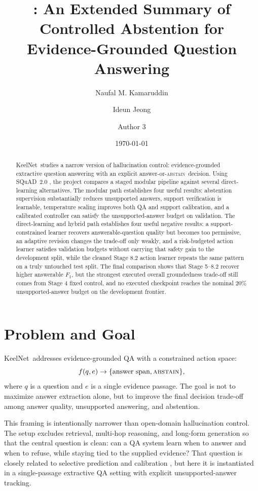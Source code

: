 \documentclass[10pt,twocolumn]{article}
\title{\system: An Extended Summary of Controlled Abstention for Evidence-Grounded Question Answering}
\author{
  Naufal M. Kamaruddin \and
  Ideun Jeong \and
  Author 3
}
\date{\today}
\newcommand{\system}{KeelNet}
\newcommand{\abstain}{\textsc{abstain}}
\begin{document}
\maketitle

\begin{abstract}
\system\ studies a narrow version of hallucination control: evidence-grounded
extractive question answering with an explicit answer-or-\abstain\ decision.
Using SQuAD~2.0 \citep{rajpurkar2018know}, the project compares a staged modular
pipeline against several direct-learning alternatives.
The modular path establishes four useful results: abstention supervision
substantially reduces unsupported answers, support verification is learnable,
temperature scaling improves both QA and support calibration, and a calibrated
controller can satisfy the unsupported-answer budget on validation.
The direct-learning and hybrid path establishes four useful negative results: a
support-constrained learner recovers answerable-question quality but becomes too
permissive, an adaptive revision changes the trade-off only weakly, and a
risk-budgeted action learner satisfies validation budgets without carrying that
safety gain to the development split, while the cleaned Stage 8.2 action
learner repeats the same pattern on a truly untouched test split.
The final comparison shows that Stage 5--8.2 recover higher answerable
\(F_1\), but the strongest executed overall groundedness trade-off still comes
from Stage 4 fixed control, and no executed checkpoint reaches the nominal
20\% unsupported-answer budget on the development frontier.
\end{abstract}

\section{Problem and Goal}
\system\ addresses evidence-grounded QA with a constrained action space:
\begin{equation}
f(q, e) \rightarrow \{\text{answer span}, \abstain\},
\end{equation}
where \(q\) is a question and \(e\) is a single evidence passage.
The goal is not to maximize answer extraction alone, but to improve the final
decision trade-off among answer quality, unsupported answering, and abstention.

This framing is intentionally narrower than open-domain hallucination control.
The setup excludes retrieval, multi-hop reasoning, and long-form generation so
that the central question is clean: can a QA system learn when to answer and
when to refuse, while staying tied to the supplied evidence?
That question is closely related to selective prediction and calibration
\citep{geifman2019selectivenet,jiang2021how}, but here it is instantiated in a
single-passage extractive QA setting with explicit unsupported-answer tracking.
\end{document}
